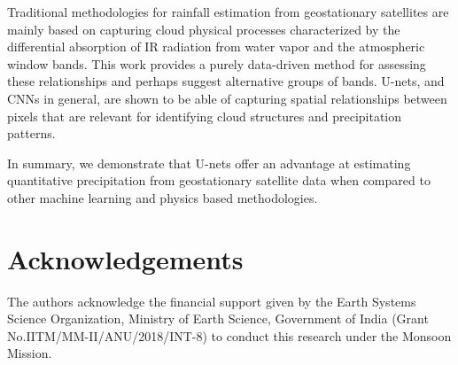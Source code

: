 \documentclass[3p,times]{elsarticle}
\begin{document}
Traditional methodologies for rainfall estimation from geostationary satellites are mainly based on capturing cloud physical processes characterized by the differential absorption of IR radiation from water vapor and the atmospheric window bands. This work provides a purely data-driven method for assessing these relationships and perhaps suggest alternative groups of bands. U-nets, and CNNs in general, are shown to be able of capturing spatial relationships between pixels that are relevant for identifying cloud structures and precipitation patterns.

In summary, we demonstrate that U-nets offer an advantage at estimating quantitative precipitation from geostationary satellite data when compared to other machine learning and physics based methodologies.


\section{Acknowledgements}

The authors acknowledge the financial support given by the Earth Systems Science Organization, Ministry of Earth Science, Government of India (Grant No.IITM/MM-II/ANU/2018/INT-8) to conduct this research under the Monsoon Mission.













\end{document}
